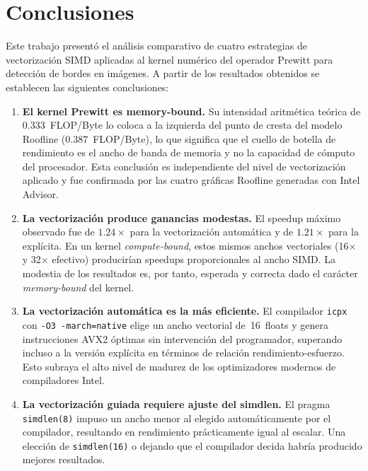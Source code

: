 \section{Conclusiones}

Este trabajo present\'o el an\'alisis comparativo de cuatro
estrategias de vectorizaci\'on SIMD aplicadas al kernel num\'erico
del operador Prewitt para detecci\'on de bordes en im\'agenes.
A partir de los resultados obtenidos se establecen las siguientes
conclusiones:

\begin{enumerate}
  \item \textbf{El kernel Prewitt es memory-bound.}
    Su intensidad aritm\'etica te\'orica de $0.333$~FLOP/Byte
    lo coloca a la izquierda del punto de cresta del modelo
    Roofline ($0.387$~FLOP/Byte), lo que significa que el
    cuello de botella de rendimiento es el ancho de banda de
    memoria y no la capacidad de c\'omputo del procesador.
    Esta conclusi\'on es independiente del nivel de vectorizaci\'on
    aplicado y fue confirmada por las cuatro gr\'aficas Roofline
    generadas con Intel Advisor.

  \item \textbf{La vectorizaci\'on produce ganancias modestas.}
    El speedup m\'aximo observado fue de $1.24\times$ para la
    vectorizaci\'on autom\'atica y de $1.21\times$ para la
    expl\'icita.
    En un kernel \textit{compute-bound}, estos mismos anchos
    vectoriales (16$\times$ y 32$\times$ efectivo) producir\'ian
    speedups proporcionales al ancho SIMD.
    La modestia de los resultados es, por tanto, esperada y
    correcta dado el car\'acter \textit{memory-bound} del kernel.

  \item \textbf{La vectorizaci\'on autom\'atica es la m\'as eficiente.}
    El compilador \texttt{icpx} con \texttt{-O3 -march=native}
    elige un ancho vectorial de~16~floats y genera instrucciones
    AVX2 \'optimas sin intervenci\'on del programador, superando
    incluso a la versi\'on expl\'icita en t\'erminos de relaci\'on
    rendimiento-esfuerzo.
    Esto subraya el alto nivel de madurez de los optimizadores
    modernos de compiladores Intel.

  \item \textbf{La vectorizaci\'on guiada requiere ajuste del simdlen.}
    El pragma \texttt{simdlen(8)} impuso un ancho menor al
    elegido autom\'aticamente por el compilador, resultando en
    rendimiento pr\'acticamente igual al escalar.
    Una elecci\'on de \texttt{simdlen(16)} o dejando que el
    compilador decida habr\'ia producido mejores resultados.


\end{enumerate}
